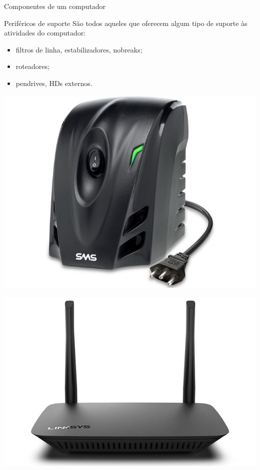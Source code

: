 \begin{frame}{Componentes de um computador}
	\begin{block}{Periféricos de suporte}
		São todos aqueles que oferecem algum tipo de suporte às
		atividades do computador:
		\begin{itemize}
			\item filtros de linha, estabilizadores, nobreaks;
			\item roteadores;
			\item pendrives, HDs externos.
		\end{itemize}
	\end{block}

	\begin{minipage}{0.49\linewidth}
		\centering
		\includegraphics[width=0.8\linewidth]{Figuras/Ch01/fig28}
	\end{minipage}\hfill
	\begin{minipage}{0.49\linewidth}
		\centering
		\includegraphics[width=1\linewidth]{Figuras/Ch01/fig29}
	\end{minipage}
\end{frame}


